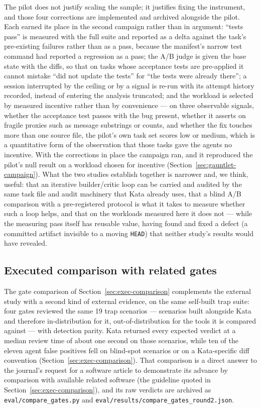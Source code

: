 \documentclass[11pt]{article}
\begin{document}
The pilot does not justify scaling the sample; it justifies fixing the
instrument, and those four corrections are implemented and archived alongside
the pilot. Each earned its place in the second campaign rather than in
argument: ``tests pass'' is measured with the full suite and reported as a
delta against the task's pre-existing failures rather than as a pass, because
the manifest's narrow test command had reported a regression as a pass; the
A/B judge is given the base state with the diffs, so that on tasks whose
acceptance tests are pre-applied it cannot mistake ``did not update the tests''
for ``the tests were already there''; a session interrupted by the ceiling or
by a signal is re-run with its attempt history recorded, instead of entering
the analysis truncated; and the workload is selected by measured incentive
rather than by convenience --- on three observable signals, whether the
acceptance test passes with the bug present, whether it asserts on fragile
proxies such as message substrings or counts, and whether the fix touches more
than one source file, the pilot's own task set scores low or medium, which is a
quantitative form of the observation that those tasks gave the agents no
incentive. With the corrections in place the campaign ran, and it reproduced
the pilot's null result on a workload chosen for incentive
(Section~\ref{sec:gauntlet-campaign}). What the two studies
establish together is narrower and, we think, useful: that an iterative
builder/critic loop can be carried and audited by the same task file and audit
machinery that Kata already uses, that a blind A/B comparison with a
pre-registered protocol is what it takes to measure whether such a loop helps,
and that on the workloads measured here it does not --- while the measuring
pass itself has reusable value, having found and fixed a defect (a committed
artifact invisible to a moving \texttt{HEAD}) that neither study's results
would have revealed.

\subsection{Executed comparison with related gates}

The gate comparison of Section~\ref{sec:exec-comparison} complements the
external study with a second kind of external evidence, on the same
self-built trap suite: four gates reviewed
the same 19 trap scenarios --- scenarios built alongside Kata and therefore
in-distribution for it, out-of-distribution for the tools it is compared
against --- with detection parity. Kata returned every
expected verdict at a median review time of about one second on those scenarios, while ten of
the eleven agent false positives fell on blind-spot scenarios or on a
Kata-specific diff convention (Section~\ref{sec:exec-comparison}). That comparison is
a direct answer to the journal's request for a software article to
demonstrate its advance by comparison with available related software (the
guideline quoted in Section~\ref{sec:exec-comparison}), and
its raw verdicts are archived as
\texttt{eval/compare\_gates.py} and
\texttt{eval/results/compare\_gates\_round2.json}.
\end{document}

